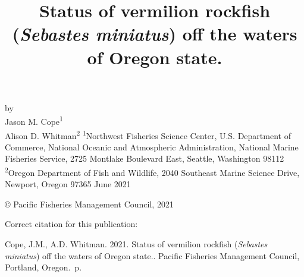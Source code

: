 \documentclass[11pt,
  english,
  a4paper,
]{article}
\date{}
\newcommand{\trTitle}{Status of vermilion rockfish (\emph{Sebastes miniatus}) off the waters of Oregon state.}
\newcommand{\trYear}{2021}
\newcommand{\trMonth}{June}
\newcommand{\trAuthsBack}{Cope, J.M., A.D. Whitman}
\newcommand{\trCitation}{
\begin{hangparas}{1em}{1}
\trAuthsBack{}. \trYear{}. \trTitle{}. Pacific Fisheries Management Council, Portland, Oregon. \pageref{LastPage}{}\,p.
\end{hangparas}}
\begin{document}

\renewcommand*{\thefootnote}{\fnsymbol{footnote}}

\small
\thispagestyle{empty}
\noindent
\begin{center}
\title{Status of vermilion rockfish (\emph{Sebastes miniatus}) off the waters of Oregon state.}
\vspace{1.5cm}
{\Large\textbf{}}
\vfill
by\\
Jason M. Cope\textsuperscript{1}\\
Alison D. Whitman\textsuperscript{2}\vfill
\textsuperscript{1}Northwest Fisheries Science Center, U.S. Department of Commerce, National Oceanic and Atmospheric Administration, National Marine Fisheries Service, 2725 Montlake Boulevard East, Seattle, Washington 98112\\
\textsuperscript{2}Oregon Department of Fish and Wildlife, 2040 Southeast Marine Science Drive, Newport, Oregon 97365\vfill
\trMonth{} \trYear{}
\end{center}
\clearpage

\thispagestyle{empty}
\vspace*{\fill}
\begin{center}
\copyright{} Pacific Fisheries Management Council, \trYear{}\\
\end{center}
\par
\bigskip
\noindent
Correct citation for this publication:
\bigskip
\par
\trCitation{}
\clearpage


\tableofcontents\clearpage
\label{TRlastRoman}
\clearpage

\newpage
\thispagestyle{empty} %

\pagestyle{plain}  %
\renewcommand*{\thefootnote}{\arabic{footnote}}  %
\setcounter{footnote}{0}  %
\renewcommand{\headrulewidth}{0.5pt}
\renewcommand{\footrulewidth}{0.5pt}
\end{document}
